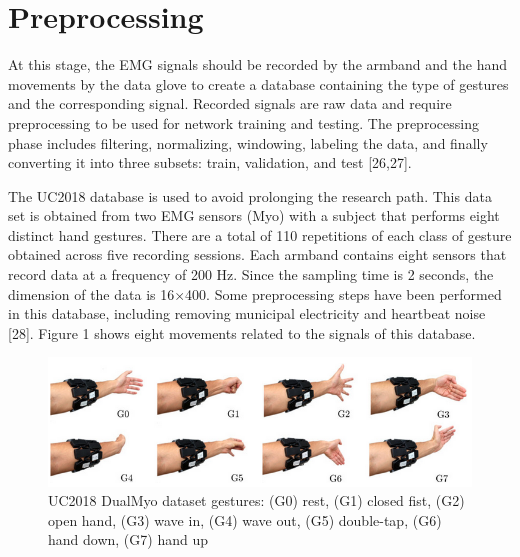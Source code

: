 \section{Preprocessing}
At this stage, the EMG signals should be recorded by the armband and the hand movements by the data glove to create a database containing the type of gestures and the corresponding signal.  Recorded signals are raw data and require preprocessing to be used for network training and testing. The preprocessing phase includes filtering, normalizing, windowing, labeling the data, and finally converting it into three subsets: train, validation, and test [26,27].

The UC2018 database is used to avoid prolonging the research path. This data set is obtained from two EMG sensors (Myo) with a subject that performs eight distinct hand gestures. There are a total of 110 repetitions of each class of gesture obtained across five recording sessions. Each armband contains eight sensors that record data at a frequency of 200 Hz. Since the sampling time is 2 seconds, the dimension of the data is 16×400. Some preprocessing steps have been performed in this database, including removing municipal electricity and heartbeat noise [28]. Figure 1 shows eight movements related to the signals of this database.

\begin{figure}
    \centering
    \includegraphics[scale=0.49]{figures/gestures.png}
    \caption{\centering
    UC2018 DualMyo dataset gestures: (G0) rest, (G1) closed fist, (G2) open hand, (G3) wave in, (G4) wave out, (G5) double-tap, (G6) hand down, (G7) hand up}
    \label{fig:gestures}
\end{figure}

